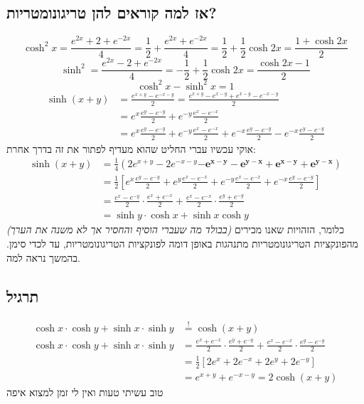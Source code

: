 \documentclass[]{article}
\newcommand\seq   {\overset{!}{=}}
\begin{document}
	\subsection{אז למה קוראים להן טריגונומטריות?}
	\[ \cosh^2 x = \frac{e^{2x} + 2 + e^{-2x}}{4} = \frac{1}{2} + \frac{e^{2x} + e^{-2x}}{4} = \frac{1}{2} + \frac{1}{2}\cosh 2x = \frac{1 + \cosh 2x}{2} \]
	\[ \sinh^2 = \frac{e^{2x} - 2 + e^{-2x}}{4}= -\frac{1}{2} + \frac{1}{2}\cosh 2x = \frac{\cosh 2x - 1}{2} \]
	\[ \cosh^2x - \sinh^2x = 1 \]
	\begin{align}
		\sinh(x + y) &= \frac{e^{x + y}- e ^{-x - y}}{2} = \frac{e^{x + y} - e^{x - y} + e^{x - y} - e^{-x - y}}{2} \\
		&= e^x \frac{e^y - e^{-y}}{2} + e^{-y} \frac{e^x - e^{-x}}{2} \\
		&= e^x \frac{e^y - e^{-y}}{2} + e^{-y} \frac{e^x - e^{-x}}{2} + e^{-x}\frac{e^y - e^{-y}}{2} - e^{-x}\frac{e^y - e^{-y}}{2}
	\end{align}
	אוקי עכשיו עברי החליט שהוא מעדיף לפתור את זה בדרך אחרת: 
	\begin{align}
		\sinh(x + y) &= \frac{1}{4}(2 e^{x + y} - 2e^{-x - y} \bm{- e^{x - y} - e^{y - x} + e^{x - y} + e^{y - x}}) \\
		&= \frac{1}{2}\left [ e^x\frac{e^y - e^{-y}}{2} + e^y \frac{e^x - e^{-x}}{2} + e^{-y} \frac{e^x-e^{-x}}{2} + e^{-x}\frac{e^y - e^{-y}}{2} \right ] \\
		&= \frac{e^x - e^{-y}}{2} \cdot \frac{e^x + e^{-x}}{2} + \frac{e^x - e^{-x}}{2} \cdot \frac{e^y + e^{-y}}{2}\\
		&= \sinh y \cdot \cosh x + \sinh x \cosh y
	\end{align}
	\textit{(בבולד מה שעברי הוסיף והחסיר אך לא משנה את הערך)}
	כלומר, הזהויות שאנו מכירים מהפונקציות הטריגונומטריות מתנהגות באופן דומה לפונקציות הטריגונומטריות, עד לכדי סימן. בהמשך נראה למה. 
	
	\subsection{תרגיל}
	\begin{align}
		\cosh x \cdot \cosh y + \sinh x \cdot \sinh y &\seq \cosh(x + y) \\
		\cosh x \cdot \cosh y + \sinh x \cdot \sinh y &= \frac{e^x + e^{-x}}{2} \cdot \frac{e^y + e^{-y}}{2} + \frac{e^x - e^{-x}}{2} \cdot \frac{e^y - e^{-y}}{2}\\
		&=\frac{1}{2}\left [ 2e^x + 2e^{-x} + 2e^y + 2e^{-y} \right ] \\
		&=e^{x + y} + e^{-x - y} = 2\cosh(x + y)
	\end{align}
	טוב עשיתי טעות ואין לי זמן למצוא איפה
	
\end{document}
